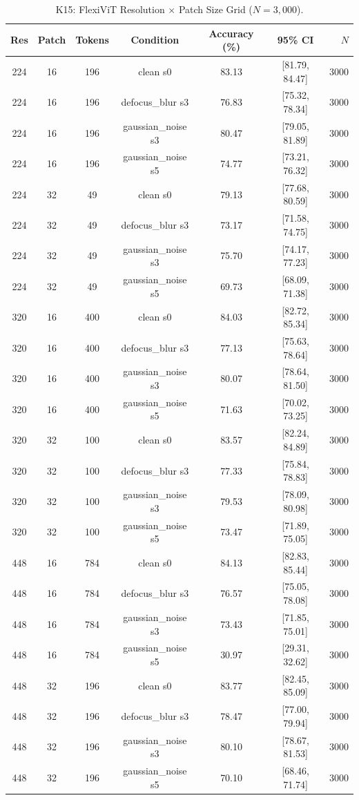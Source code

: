 \begin{table}[t]
\centering
\caption{K15: FlexiViT Resolution $\times$ Patch Size Grid ($N=3{,}000$).}
\label{tab:k15_flexivit_grid}
\small
\begin{tabular}{ccccccr}
\toprule
Res & Patch & Tokens & Condition & Accuracy (\%) & 95\% CI & $N$ \\
\midrule
224 & 16 & 196 & clean s0 & 83.13 & [81.79, 84.47] & 3000 \\
224 & 16 & 196 & defocus_blur s3 & 76.83 & [75.32, 78.34] & 3000 \\
224 & 16 & 196 & gaussian_noise s3 & 80.47 & [79.05, 81.89] & 3000 \\
224 & 16 & 196 & gaussian_noise s5 & 74.77 & [73.21, 76.32] & 3000 \\
224 & 32 & 49 & clean s0 & 79.13 & [77.68, 80.59] & 3000 \\
224 & 32 & 49 & defocus_blur s3 & 73.17 & [71.58, 74.75] & 3000 \\
224 & 32 & 49 & gaussian_noise s3 & 75.70 & [74.17, 77.23] & 3000 \\
224 & 32 & 49 & gaussian_noise s5 & 69.73 & [68.09, 71.38] & 3000 \\
320 & 16 & 400 & clean s0 & 84.03 & [82.72, 85.34] & 3000 \\
320 & 16 & 400 & defocus_blur s3 & 77.13 & [75.63, 78.64] & 3000 \\
320 & 16 & 400 & gaussian_noise s3 & 80.07 & [78.64, 81.50] & 3000 \\
320 & 16 & 400 & gaussian_noise s5 & 71.63 & [70.02, 73.25] & 3000 \\
320 & 32 & 100 & clean s0 & 83.57 & [82.24, 84.89] & 3000 \\
320 & 32 & 100 & defocus_blur s3 & 77.33 & [75.84, 78.83] & 3000 \\
320 & 32 & 100 & gaussian_noise s3 & 79.53 & [78.09, 80.98] & 3000 \\
320 & 32 & 100 & gaussian_noise s5 & 73.47 & [71.89, 75.05] & 3000 \\
448 & 16 & 784 & clean s0 & 84.13 & [82.83, 85.44] & 3000 \\
448 & 16 & 784 & defocus_blur s3 & 76.57 & [75.05, 78.08] & 3000 \\
448 & 16 & 784 & gaussian_noise s3 & 73.43 & [71.85, 75.01] & 3000 \\
448 & 16 & 784 & gaussian_noise s5 & 30.97 & [29.31, 32.62] & 3000 \\
448 & 32 & 196 & clean s0 & 83.77 & [82.45, 85.09] & 3000 \\
448 & 32 & 196 & defocus_blur s3 & 78.47 & [77.00, 79.94] & 3000 \\
448 & 32 & 196 & gaussian_noise s3 & 80.10 & [78.67, 81.53] & 3000 \\
448 & 32 & 196 & gaussian_noise s5 & 70.10 & [68.46, 71.74] & 3000 \\
\bottomrule
\end{tabular}
\end{table}